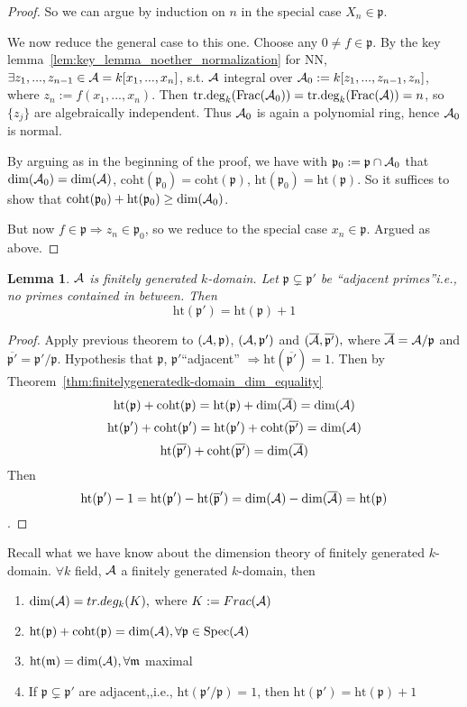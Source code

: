 \documentclass[11pt]{article}
\newtheorem{lemma}[thm]{Lemma}
\newcommand{\scm}{{\mathfrak m}}
\newcommand{\scp}{{\mathfrak p}}
\newcommand{\cala}{{\cal A}}
\newcommand{\Lrta}{\Longrightarrow}
\begin{document}
\begin{proof}
So we can argue by induction on $n$ in the special case $X_n\in \scp$. 

We now reduce the general case to this one.
Choose any $0\neq f\in \scp$. By the key lemma~\ref{lem:key_lemma_noether_normalization} for NN, $\exists z_1,...,z_{n-1}\in\cala=k[x_1,...,x_n]$, s.t. $\cala$ integral over $\cala_0:=k[z_1,...,z_{n-1},z_n]$, where $z_n:=f(x_1,...,x_n)$. Then $\text{tr.deg}_k (\text{Frac}(\cala_0))=\text{tr.deg}_k(\text{Frac}(\cala))=n$, so $\{z_j\}$ are algebraically independent. Thus $\cala_0$ is again a polynomial ring, hence $\cala_0$ is normal.

By arguing as in the beginning of the proof, we have with $\scp_0:=\scp\cap\cala_0$ that $\text{dim}(\cala_0)=\text{dim}(\cala)$, $\text{coht}(\scp_0)=\text{coht}(\scp)$, $\text{ht}(\scp_0)=\text{ht}(\scp)$. So it suffices to show that $\text{coht}(\scp_0)+\text{ht}(\scp_0)\geq \text{dim}(\cala_0)$. 

But now $f\in\scp\Lrta z_n\in\scp_0$, so we reduce to the special case $x_n\in\scp$. Argued as above. 
\end{proof}

\begin{lemma}
$\cala$ is finitely generated $k$-domain. Let $\scp\subsetneq \scp'$ be ``adjacent primes''i.e., no primes contained in between. Then 
$$
\text{ht}(\scp')=\text{ht}(\scp)+1
$$
\end{lemma}
\begin{proof}
Apply previous theorem to $(\cala,\scp)$, $(\cala,\scp')$ and $(\overline{\cala},\overline{\scp'}),$ where $\overline{\cala}=\cala/\scp$ and $\overline{\scp'}=\scp'/\scp$. Hypothesis that $\scp$, $\scp'$``adjacent'' $\Lrta \text{ht}(\overline{\scp'})=1$.
Then by Theorem~\ref{thm:finitelygeneratedk-domain_dim_equality}
$$
\text{ht}(\scp)+\text{coht}(\scp)=\text{ht}(\scp)+\text{dim}(\overline{\cala})=\text{dim}(\cala)
$$
$$
\text{ht}(\scp')+\text{coht}(\scp')=\text{ht}(\scp')+\text{coht}(\overline{\scp'})=\text{dim}(\cala)
$$
$$
\text{ht}(\overline{\scp'})+\text{coht}(\overline{\scp'})=\text{dim}(\overline{\cala})
$$
Then
$$
\text{ht}(\scp')-1=\text{ht}(\scp')-\text{ht}(\overline{\scp}')=\text{dim}(\cala)-\text{dim}(\overline{\cala})=\text{ht}(\scp)
$$.
\end{proof}


Recall what we have know about the dimension theory of finitely generated $k$-domain. $\forall k$ field, $\cala$ a finitely generated $k$-domain, then
\begin{enumerate}[label=(\roman*)]
\item $\text{dim}(\cala)=tr.deg_k(K),$ where $K:=Frac(\cala)$
\item $\text{ht}(\scp)+\text{coht}(\scp)=\text{dim}(\cala),\forall \scp\in \text{Spec}(\cala)$
\item $\text{ht}(\scm)=\text{dim}(\cala),\forall \scm$ maximal
\item If $\scp\subsetneq \scp'$ are adjacent,,i.e., $\text{ht}(\scp'/\scp)=1$, then $\text{ht}(\scp')=\text{ht}(\scp)+1$
\end{enumerate}
\end{document}
